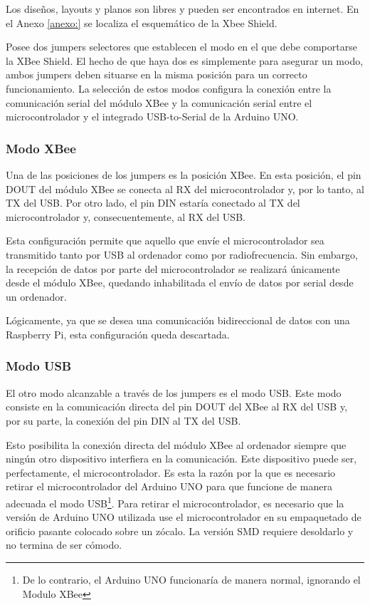 Los diseños, layouts y planos son libres y pueden ser encontrados en internet. En el Anexo \ref{anexo:} se localiza el esquemático de la Xbee Shield.

Posee dos jumpers selectores que establecen el modo en el que debe comportarse la XBee Shield. El hecho de que haya dos es simplemente para asegurar un modo, ambos jumpers deben situarse en la misma posición para un correcto funcionamiento. La selección de estos modos configura la conexión entre la comunicación serial del módulo XBee y la comunicación serial entre el microcontrolador y el integrado USB-to-Serial de la Arduino UNO.

\subsubsection{Modo XBee}

Una de las posiciones de los jumpers es la posición XBee. En esta posición, el pin DOUT del módulo XBee se conecta al RX del microcontrolador y, por lo tanto, al TX del USB. Por otro lado, el pin DIN estaría conectado al TX del microcontrolador y, consecuentemente, al RX del USB.

Esta configuración permite que aquello que envíe el microcontrolador sea transmitido tanto por USB al ordenador como por radiofrecuencia. Sin embargo, la recepción de datos por parte del microcontrolador se realizará únicamente desde el módulo XBee, quedando inhabilitada el envío de datos por serial desde un ordenador.

Lógicamente, ya que se desea una comunicación bidireccional de datos con una Raspberry Pi, esta configuración queda descartada.

\subsubsection{Modo USB}\label{subsubsec:USBXB}

El otro modo alcanzable a través de los jumpers es el modo USB. Este modo consiste en la comunicación directa del pin DOUT del XBee al RX del USB y, por su parte, la conexión del pin DIN al TX del USB. 

Esto posibilita la conexión directa del módulo XBee al ordenador siempre que ningún otro dispositivo interfiera en la comunicación. Este dispositivo puede ser, perfectamente, el microcontrolador. Es esta la razón por la que es necesario retirar el microcontrolador del Arduino UNO para que funcione de manera adecuada el modo USB\footnote{De lo contrario, el Arduino UNO funcionaría de manera normal, ignorando el Modulo XBee}. Para retirar el microcontrolador, es necesario que la versión de Arduino UNO utilizada use el microcontrolador en su empaquetado de orificio pasante colocado sobre un zócalo. La versión SMD requiere desoldarlo y no termina de ser cómodo.

